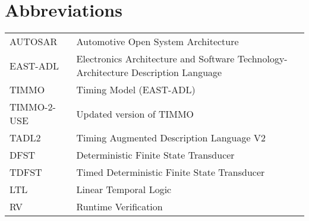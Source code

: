 
\cleardoublepage
{}
{}
\chapter*{Abbreviations}
\label{section-abbrevs}

\begin{tabularx}{\textwidth}{lX}
	AUTOSAR & Automotive Open System Architecture\\
	EAST-ADL  & Electronics Architecture and Software Technology-Architecture Description Language\\
	TIMMO	& Timing Model (EAST-ADL)\\
	TIMMO-2-USE & Updated version of TIMMO\\
	TADL2 & Timing Augmented Description Language V2\\
  	DFST & Deterministic Finite State Transducer\\
  	TDFST & Timed Deterministic Finite State Transducer\\
  	LTL & Linear Temporal Logic\\
  	RV	& Runtime Verification

\end{tabularx}
